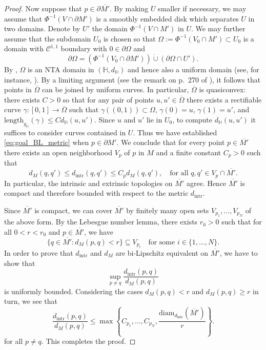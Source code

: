 \documentclass[10pt,letterpaper]{amsart}
\theoremstyle{definition}
\numberwithin{thm}{subsection}
\numberwithin{equation}{section}
\begin{document}
\begin{proof}
Now suppose that $p \in \partial \overline{M'}$. By making $U$
smaller if necessary, we may assume that $\Phi^{-1}(V\cap \partial
M')$ is a smoothly embedded disk which separates $U$ in two
domains.  Denote by $U'$ the domain $\Phi^{-1}(V\cap M')$ in
$U$. We may further assume that the subdomain $U_0$ is chosen so
that $\Omega := \Phi^{-1}(V_0 \cap M') \subset U_0$ is a domain
with $\mathcal{C}^{1,1}$ boundary with $0 \in \partial\Omega$ and
\begin{displaymath}
\partial \Omega = \left(\Phi^{-1}(V_0 \cap \partial M') \right) \dot{\cup} \left(\partial \Omega \cap U'\right).
\end{displaymath}
By \cite[Theorem 1.3]{MR2135732}, $\Omega$ is an NTA domain in $({\mathbb H},d_{\mathbb H})$ and hence also a uniform domain (see, for instance, \cite[Proposition 4.2]{MR1323792}). By a limiting argument (see the remark on p.\ 270 of \cite{MR1323792}), it follows that points in $\overline{\Omega}$ can be joined by uniform curves. In particular, $\overline{\Omega}$ is quasiconvex: there exists $C>0$ so that for any pair of points $u,u'\in \overline\Omega$ there exists a rectifiable curve $\gamma:[0,1] \to \overline{\Omega}$ such that $\gamma((0,1))\subset \Omega$, $\gamma(0)=u$, $\gamma(1)=u'$, and $\mathrm{length}_{g_{\mathbb H}}(\gamma) \leq C d_{\mathbb H}(u,u')$. Since $u$ and $u'$ lie in $U_0$, to compute $d_{\mathbb H}(u,u')$ it suffices to consider curves contained in $U$. Thus we have established \eqref{eq:goal_BL_metric} when $p \in \partial M'$. We conclude that for every point $p\in \overline{M'}$ there exists an open neighborhood $V_p$ of $p$ in $M$ and a finite constant $C_p>0$ such that
\begin{displaymath}
d_M(q,q') \leq d_{\mathrm{intr}}(q,q') \leq C_p d_M(q,q'),\quad \text{for all }q,q'\in V_p \cap \overline{M'}.
\end{displaymath}
In particular, the intrinsic and extrinsic topologies on $\overline{M'}$ agree. Hence $\overline{M'}$ is compact and therefore bounded with respect to the metric $d_{\mathrm{intr}}$.

Since $\overline{M'}$ is compact, we can cover $\overline{M'}$ by finitely many open sets $V_{p_1},\ldots, V_{p_N}$ of the above form. By the Lebesgue number lemma, there exists $r_0>0$ such that for all $0<r<r_0$ and $p\in \overline{M'}$, we have
\begin{equation}\label{eq:LebesgueNumber}
\{q\in \overline{M'}: d_M(p,q) < r\}\subseteq V_{p_i}\quad \text{for some }i\in \{1,\ldots,N \}.
\end{equation}
In order to prove that $d_{\mathrm{intr}}$ and $d_M$ are bi-Lipschitz equivalent on $\overline{M'}$, we have to show that
\begin{displaymath}
\sup_{p\neq q}\frac{d_{\mathrm{intr}}(p,q)}{d_M(p,q)}
\end{displaymath}
is uniformly bounded. Considering the cases $d_M(p,q)<r$ and $d_M(p,q)\ge r$ in turn, we see that
$$
\frac{d_{\mathrm{intr}}(p,q)}{d_M(p,q)} \le \max \left\{ C_{p_1},\ldots,C_{p_N},\frac{\mathrm{diam}_{d_{\mathrm{intr}}}(\overline{M'})}{r} \right\}.
$$
for all $p \ne q$. This completes the proof.
\end{proof}
\end{document}
